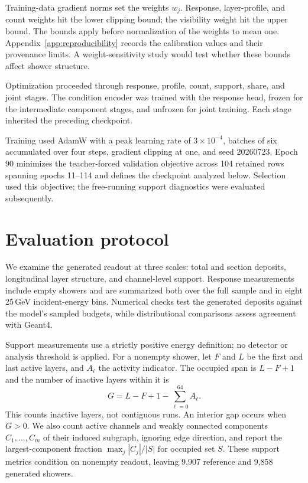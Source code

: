 \documentclass[11pt]{article}
\begin{document}
Training-data gradient norms set the weights $w_j$. Response, layer-profile, and count weights hit the lower clipping bound; the visibility weight hit the upper bound. The bounds apply before normalization of the weights to mean one. Appendix~\ref{app:reproducibility} records the calibration values and their provenance limits. A weight-sensitivity study would test whether these bounds affect shower structure.

Optimization proceeded through response, profile, count, support, share, and joint stages. The condition encoder was trained with the response head, frozen for the intermediate component stages, and unfrozen for joint training. Each stage inherited the preceding checkpoint.

Training used AdamW with a peak learning rate of $3\times10^{-4}$, batches of six accumulated over four steps, gradient clipping at one, and seed 20260723. Epoch 90 minimizes the teacher-forced validation objective across 104 retained rows spanning epochs 11--114 and defines the checkpoint analyzed below. Selection used this objective; the free-running support diagnostics were evaluated subsequently.

\section{Evaluation protocol}
\label{sec:diagnostics}

We examine the generated readout at three scales: total and section deposits, longitudinal layer structure, and channel-level support. Response measurements include empty showers and are summarized both over the full sample and in eight 25\,GeV incident-energy bins. Numerical checks test the generated deposits against the model's sampled budgets, while distributional comparisons assess agreement with Geant4.

Support measurements use a strictly positive energy definition; no detector or analysis threshold is applied. For a nonempty shower, let $F$ and $L$ be the first and last active layers, and $A_\ell$ the activity indicator. The occupied span is $L-F+1$ and the number of inactive layers within it is
\begin{equation}
 G=L-F+1-\sum_{\ell=0}^{64}A_\ell.
 \label{eq:gaps}
\end{equation}
This counts inactive layers, not contiguous runs. An interior gap occurs when $G>0$. We also count active channels and weakly connected components $C_1,\ldots,C_m$ of their induced subgraph, ignoring edge direction, and report the largest-component fraction $\max_j|C_j|/|S|$ for occupied set $S$. These support metrics condition on nonempty readout, leaving 9,907 reference and 9,858 generated showers.
\end{document}
